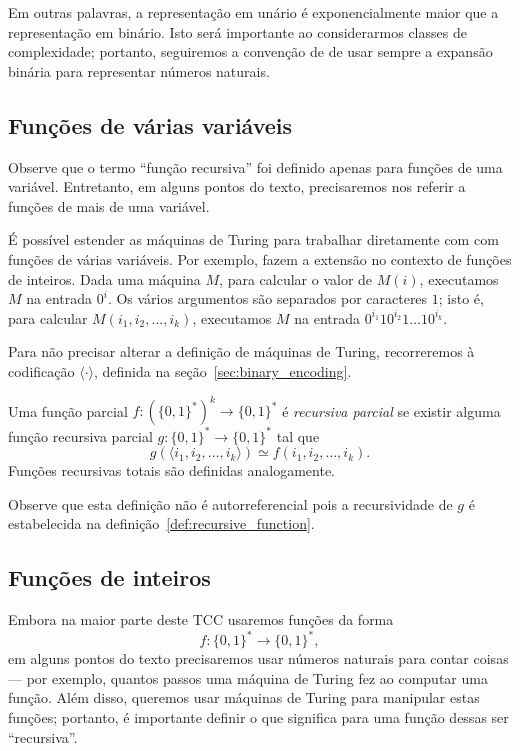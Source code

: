 Em outras palavras,
a representação em unário é exponencialmente maior que a representação em binário.
Isto será importante ao considerarmos classes de complexidade;
portanto,
seguiremos a convenção de 
de usar sempre a expansão binária para representar números naturais.

\subsection{Funções de várias variáveis}

Observe que o termo ``função recursiva''
foi definido apenas para funções de uma variável.
Entretanto,
em alguns pontos do texto,
precisaremos nos referir a funções de mais de uma variável.

É possível estender as máquinas de Turing
para trabalhar diretamente com com funções de várias variáveis.
Por exemplo, 
fazem a extensão no contexto de funções de inteiros.
Dada uma máquina $M$,
para calcular o valor de $M(i)$,
executamos $M$ na entrada $0^i$.
Os vários argumentos são separados por caracteres $1$;
isto é, para calcular $M(i_1, i_2, \dots, i_k)$,
executamos $M$ na entrada $0^{i_1} 1 0^{i_2} 1 \dots 1 0^{i_k}$.

Para não precisar alterar a definição de máquinas de Turing,
recorreremos à codificação $\langle \cdot \rangle$,
definida na seção~\ref{sec:binary_encoding}.

\begin{definition}
    \label{def:multi_valued_recursive_function}
    Uma função parcial $f: (\{0, 1\}^*)^k \to \{0, 1\}^*$ é \emph{recursiva parcial}
    se existir alguma função recursiva parcial $g: \{0, 1\}^* \to \{0, 1\}^*$
    tal que
    \begin{equation*}
        g(\langle i_1, i_2, \dots, i_k \rangle) \simeq f(i_1, i_2, \dots, i_k).
    \end{equation*}
    Funções recursivas totais são definidas analogamente.
\end{definition}

Observe que esta definição não é autorreferencial
pois a recursividade de $g$ é estabelecida na definição~\ref{def:recursive_function}.

\subsection{Funções de inteiros}

Embora na maior parte deste TCC usaremos funções da forma
\begin{equation*}
    f : \{0, 1\}^* \to \{0, 1\}^*,
\end{equation*}
em alguns pontos do texto precisaremos usar números naturais para contar coisas
--- por exemplo,
quantos passos uma máquina de Turing fez ao computar uma função.
Além disso,
queremos usar máquinas de Turing para manipular estas funções;
portanto,
é importante definir o que significa para uma função dessas ser ``recursiva''.

